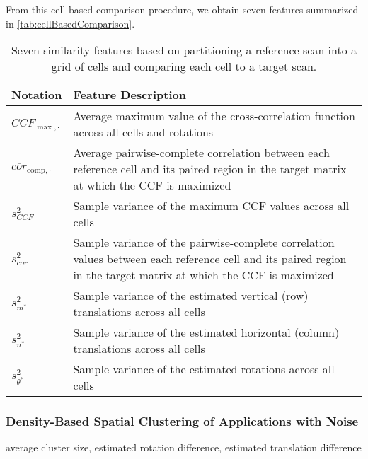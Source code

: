 \documentclass[
]{jdssv}
\begin{document}
From this cell-based comparison procedure, we obtain seven features
summarized in \autoref{tab:cellBasedComparison}.

\begin{table}[htbp]
    \centering
    \begin{tabular}{|p{.11\linewidth}|p{.7\linewidth}|}
    \hline
        \textbf{Notation} & \textbf{Feature Description} \\
        \hline
        $\overline{CCF}_{\max, \cdot}$ & Average maximum value of the cross-correlation function across all cells and rotations \\
        \hline
        $\overline{cor}_{\text{comp}, \cdot}$ & Average pairwise-complete correlation between each reference cell and its paired region in the target matrix at which the CCF is maximized \\
        \hline
        $s_{CCF}^2$ & Sample variance of the maximum CCF values across all cells \\
        \hline
        $s_{cor}^2$ & Sample variance of the pairwise-complete correlation values between each reference cell and its paired region in the target matrix at which the CCF is maximized \\
        \hline
        $s_{m^*}^2$ & Sample variance of the estimated vertical (row) translations across all cells \\
        \hline
        $s_{n^*}^2$ & Sample variance of the estimated horizontal (column) translations across all cells \\
        \hline
        $s_{\theta^*}^2$ & Sample variance of the estimated rotations across all cells \\
        \hline
    \end{tabular}
    \caption{Seven similarity features based on partitioning a reference scan into a grid of cells and comparing each cell to a target scan.}
    \label{tab:cellBasedComparison}
\end{table}

\hypertarget{density-based-spatial-clustering-of-applications-with-noise}{%
\subsubsection{Density-Based Spatial Clustering of Applications with
Noise}\label{density-based-spatial-clustering-of-applications-with-noise}}

average cluster size, estimated rotation difference, estimated
translation difference
\end{document}
